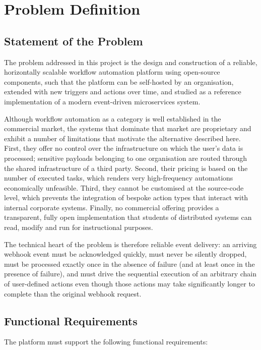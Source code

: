\chapter{Problem Definition}

\section{Statement of the Problem}

The problem addressed in this project is the design and construction of a reliable, horizontally scalable workflow automation platform using open-source components, such that the platform can be self-hosted by an organisation, extended with new triggers and actions over time, and studied as a reference implementation of a modern event-driven microservices system.

Although workflow automation as a category is well established in the commercial market, the systems that dominate that market are proprietary and exhibit a number of limitations that motivate the alternative described here. First, they offer no control over the infrastructure on which the user's data is processed; sensitive payloads belonging to one organisation are routed through the shared infrastructure of a third party. Second, their pricing is based on the number of executed tasks, which renders very high-frequency automations economically unfeasible. Third, they cannot be customised at the source-code level, which prevents the integration of bespoke action types that interact with internal corporate systems. Finally, no commercial offering provides a transparent, fully open implementation that students of distributed systems can read, modify and run for instructional purposes.

The technical heart of the problem is therefore reliable event delivery: an arriving webhook event must be acknowledged quickly, must never be silently dropped, must be processed exactly once in the absence of failure (and at least once in the presence of failure), and must drive the sequential execution of an arbitrary chain of user-defined actions even though those actions may take significantly longer to complete than the original webhook request.

\section{Functional Requirements}

The platform must support the following functional requirements:

